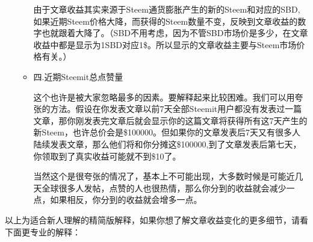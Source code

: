 \documentclass[]{ctexbook}
\begin{document}
\begin{itemize}
\begin{itemize}
    由于文章收益其实来源于Steem通货膨胀产生的新的Steem和对应的SBD,如果近期Steem价格大降，而获得的Steem数量不变，反映到文章收益的数字也就跟着大降了。（SBD不用考虑，因为不管SBD市场价是多少，在文章收益中都是显示为1SBD对应1\$。所以显示的文章收益主要与Steem市场价格有关。）
  \item
    四.近期Steemit总点赞量

    这个也许是被大家忽略最多的因素。要解释起来比较困难。我们可以用夸张的方法。假设在你发表文章以前7天全部Steemit用户都没有发表过一篇文章，那你刚发表完文章后就会显示你的这篇文章将获得所有这7天产生的新Steem，也许总价会是\$100000。但如果你的文章发表后7天又有很多人陆续发表文章，那么他们将和你分摊这\$100000,到了文章发表后第七天，你领取到了真实收益可能就不到\$10了。　

    当然这个是很夸张的情况了，基本上不可能出现，大多数时候是可能近几天全球很多人发帖，点赞的人也很热情，那么你分到的收益就会减少一点，如果相反，你分到的收益就会增多一点。
  \end{itemize}
\end{itemize}

以上为适合新人理解的精简版解释，如果你想了解文章收益变化的更多细节，请看下面更专业的解释：
\end{document}
